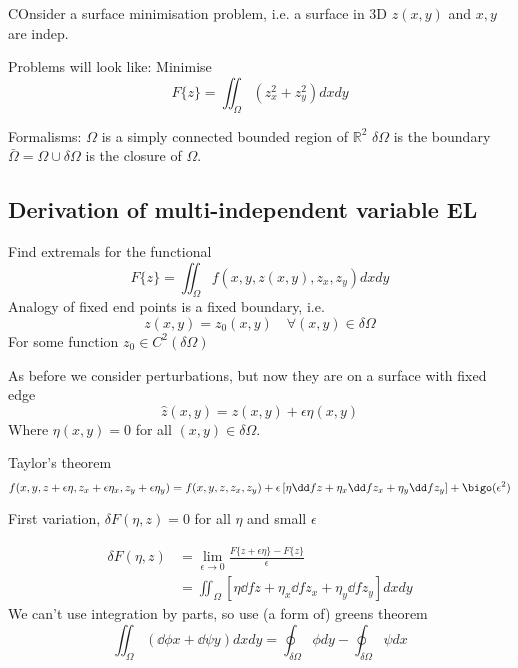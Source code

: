 \documentclass{E:/Documents/Latex/myassignment}
\begin{document}
COnsider a surface minimisation problem, i.e. a surface in 3D $z(x,y)$ and $x,y$ are indep. 

Problems will look like:
Minimise
\[F\{z\} = \iint_{\Omega} (z_x^2 + z_y^2) dxdy\]


Formalisms:
$\Omega$ is a simply connected bounded region of $\mathbb{R}^2$
$\delta \Omega$ is the boundary
$\bar{\Omega} = \Omega \cup \delta \Omega$ is the closure of $\Omega$.
\[\]
\[\]
\[\]



\subsection{Derivation of multi-independent variable EL}
Find extremals for the functional
\[F\{z\} = \iint_{\Omega} f(x,y,z(x,y),z_x,z_y) dxdy\]
Analogy of fixed end points is a fixed boundary, i.e.
\[z(x,y) = z_0(x,y) \quad \forall (x,y) \in \delta \Omega\]
For some function $z_0 \in C^2(\delta \Omega)$

As before we consider perturbations, but now they are on a surface with fixed edge
\[\hat{z}(x,y) = z(x,y) + \epsilon \eta(x,y)\]
Where $\eta(x,y) = 0$ for all $(x,y) \in \delta \Omega$.


Taylor's theorem
\[f(x,y,z+\epsilon \eta, z_x + \epsilon \eta_x, z_y + \epsilon \eta_y) = f(x,y,z,z_x,z_y) + \epsilon \left[ \eta \dd fz + \eta_x \dd f{z_x} + \eta_y \dd f{z_y} \right] + \bigo(\epsilon^2)\]

First variation, $\delta F(\eta,z) = 0$ for all $\eta$ and small $\epsilon$

\begin{align*}
	\delta F(\eta,z) &= \lim_{\epsilon \to 0} \frac{F\{z + \epsilon \eta\} - F\{z\}}{\epsilon}\\
	&= \iint_{\Omega} \left[\eta \dd fz + \eta_x \dd f{z_x} + \eta_y \dd f{z_y}\right] dxdy
\end{align*}
We can't use integration by parts, so use (a form of) greens theorem
\[\iint_{\Omega} \left(\dd\phi x + \dd\psi y\right) dxdy = \oint_{\delta \Omega} \phi dy - \oint_{\delta \Omega} \psi dx\]
\end{document}
